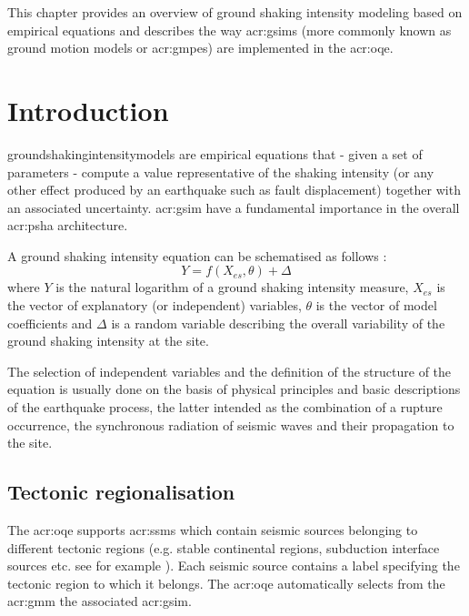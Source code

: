 This chapter provides an overview of ground shaking intensity modeling based 
on empirical equations and describes the way \glspl{acr:gsim} (more commonly 
known as ground motion models or \glspl{acr:gmpe}) are implemented in the 
\gls{acr:oqe}.
%
\section{Introduction}
%
\Glspl{groundshakingintensitymodel} are empirical equations that - given a 
set of parameters - compute a value representative of the shaking 
intensity (or any other effect produced by an earthquake such as fault 
displacement) together with an associated uncertainty. 
%
\gls{acr:gsim} have a fundamental importance in the overall \gls{acr:psha} 
architecture.

A ground shaking intensity equation can be schematised as follows 
\parencite{alatik2010}: 
\begin{equation}
Y = f(X_{es},\theta)+\Delta
\end{equation}
where $Y$ is the natural logarithm of a ground shaking intensity measure, 
$X_{es}$ is the vector of explanatory (or independent) variables, $\theta$ 
is the vector of model coefficients and $\Delta$ is a random variable 
describing the overall variability of the ground shaking intensity at 
the site.

The selection of independent variables and the definition of the structure 
of the equation is usually done on the basis of physical principles and 
basic descriptions of the earthquake process, the latter
intended as the combination of a rupture occurrence, the synchronous 
radiation of seismic waves and their propagation to the site.
%
\subsection{Tectonic regionalisation}
The \gls{acr:oqe} supports \glspl{acr:ssm} which contain seismic
sources belonging to different tectonic regions (e.g. stable continental 
regions, subduction interface sources etc. see for example
\cite{abrahamson1997}). Each seismic source contains a label specifying 
the tectonic region to which it belongs. The \gls{acr:oqe} automatically 
selects from the \gls{acr:gmm} the associated \gls{acr:gsim}.
%
